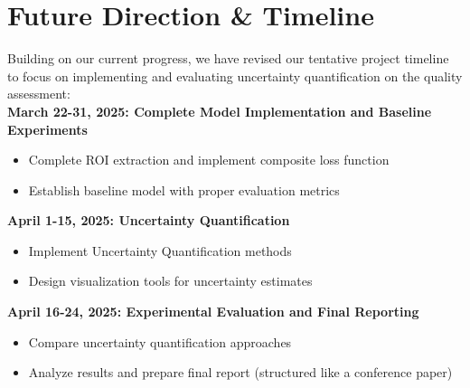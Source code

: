 \documentclass{report}
\begin{document}
\section*{Future Direction \& Timeline}

Building on our current progress, we have revised our tentative project timeline to focus on implementing and evaluating uncertainty quantification on the quality assessment:\\

\noindent \textbf{March 22-31, 2025: Complete Model Implementation and Baseline Experiments}
\begin{itemize}
    \item Complete ROI extraction and implement composite loss function
    \item Establish baseline model with proper evaluation metrics
\end{itemize}

\noindent \textbf{April 1-15, 2025: Uncertainty Quantification}
\begin{itemize}
    \item Implement Uncertainty Quantification methods
    \item Design visualization tools for uncertainty estimates
\end{itemize}

\noindent \textbf{April 16-24, 2025: Experimental Evaluation and Final Reporting}
\begin{itemize}
    \item Compare uncertainty quantification approaches
    \item Analyze results and prepare final report (structured like a conference paper)
\end{itemize}

\printbibliography
\end{document}
